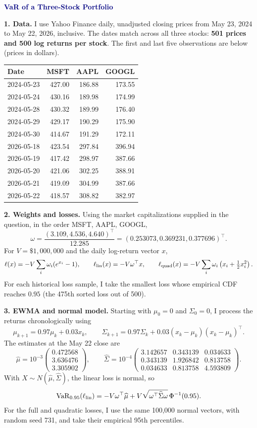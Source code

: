 \documentclass[10pt,letterpaper]{article}
\newcommand{\VaR}{\operatorname{VaR}}
\begin{document}
{\Large\bfseries\textcolor{navy}{VaR of a Three-Stock Portfolio}}

\textbf{1. Data.} I use Yahoo Finance daily, unadjusted closing prices from
May 23, 2024 to May 22, 2026, inclusive. The dates match across all three
stocks: \textbf{501 prices and 500 log returns per stock}. The first and last
five observations are below (prices in dollars).

\begin{center}
\begin{tabular}{lrrr}\toprule
Date & MSFT & AAPL & GOOGL\\\midrule
2024-05-23 & 427.00 & 186.88 & 173.55\\
2024-05-24 & 430.16 & 189.98 & 174.99\\
2024-05-28 & 430.32 & 189.99 & 176.40\\
2024-05-29 & 429.17 & 190.29 & 175.90\\
2024-05-30 & 414.67 & 191.29 & 172.11\\\midrule
2026-05-18 & 423.54 & 297.84 & 396.94\\
2026-05-19 & 417.42 & 298.97 & 387.66\\
2026-05-20 & 421.06 & 302.25 & 388.91\\
2026-05-21 & 419.09 & 304.99 & 387.66\\
2026-05-22 & 418.57 & 308.82 & 382.97\\\bottomrule
\end{tabular}
\end{center}

\textbf{2. Weights and losses.} Using the market capitalizations supplied
in the question, in the order MSFT, AAPL, GOOGL,
\[
\omega=\frac{(3.109,4.536,4.640)^\top}{12.285}
=(0.253073,0.369231,0.377696)^\top.
\]
For $V=\$1{,}000{,}000$ and the daily log-return vector $x$,
\[
\ell(x)=-V\sum_i\omega_i(e^{x_i}-1),\qquad
\ell_{\rm lin}(x)=-V\omega^\top x,\qquad
\ell_{\rm quad}(x)=-V\sum_i\omega_i\left(x_i+\tfrac12x_i^2\right).
\]
For each historical loss sample, I take the smallest loss whose empirical
CDF reaches $0.95$ (the 475th sorted loss out of 500).

\textbf{3. EWMA and normal model.} Starting with $\mu_0=0$ and $\Sigma_0=0$,
I process the returns chronologically using
\[
\mu_{k+1}=0.97\mu_k+0.03x_k,\qquad
\Sigma_{k+1}=0.97\Sigma_k+0.03(x_k-\mu_k)(x_k-\mu_k)^\top.
\]
The estimates at the May 22 close are
\[
\widehat\mu=10^{-3}
\begin{pmatrix}0.472568\\3.636476\\3.305902\end{pmatrix},\qquad
\widehat\Sigma=10^{-4}
\begin{pmatrix}
3.142657&0.343139&0.034633\\
0.343139&1.926842&0.813758\\
0.034633&0.813758&4.593809
\end{pmatrix}.
\]
With $X\sim N(\widehat\mu,\widehat\Sigma)$, the linear loss is normal, so
\[
\VaR_{0.95}(\ell_{\rm lin})
=-V\omega^\top\widehat\mu
+V\sqrt{\omega^\top\widehat\Sigma\omega}\,\Phi^{-1}(0.95).
\]
For the full and quadratic losses, I use the same 100,000 normal vectors,
with random seed 731, and take their empirical 95th percentiles.
\end{document}
